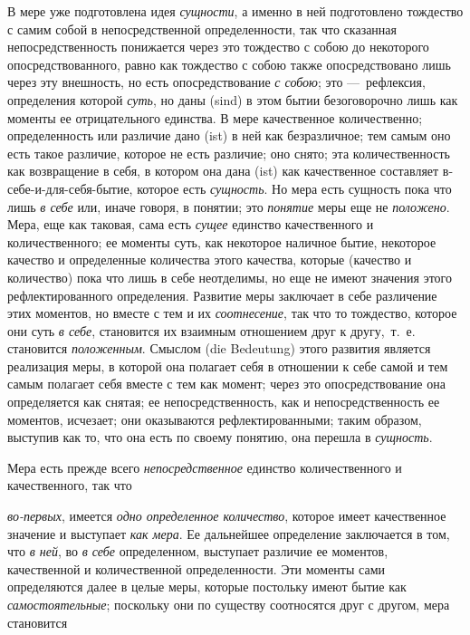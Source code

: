 В мере уже подготовлена идея {\em сущности}, а именно в
ней подготовлено тождество с самим собой в непосредственной определенности,
так что сказанная непосредственность понижается через это тождество с собою
до некоторого опосредствованного, равно как тождество с собою также
опосредствовано лишь через эту внешность, но есть опосредствование
{\em с собою}; это —~рефлексия, определения которой
{\em суть}, но даны (sind) в этом бытии безоговорочно
лишь как моменты ее отрицательного единства. В мере качественное
количественно; определенность или различие дано (ist) в ней как
безразличное; тем самым оно есть такое различие, которое не есть различие;
оно снято; эта количественность как возвращение в себя, в котором она дана
(ist) как качественное составляет в-себе-и-для-себя-бытие, которое есть
{\em сущность}. Но мера есть сущность пока что лишь
{\em в себе} или, иначе говоря, в понятии; это
{\em понятие} меры еще не
{\em положено}. Мера, еще как таковая, сама есть
{\em сущее} единство качественного и количественного;
ее моменты суть, как некоторое наличное бытие, некоторое качество и
определенные количества этого качества, которые (качество и количество)
пока что лишь в себе неотделимы, но еще не имеют значения этого
рефлектированного определения. Развитие меры заключает в себе различение
этих моментов, но вместе с тем и их {\em соотнесение},
так что то тождество, которое они суть {\em в себе},
становится их взаимным отношением друг к другу,~т.~е. становится
{\em положенным}. Смыслом (die Bedeutung) этого
развития является реализация меры, в которой она полагает себя в отношении
к себе самой и тем самым полагает себя вместе с тем как момент; через это
опосредствование она определяется как снятая; ее непосредственность, как и
непосредственность ее моментов, исчезает; они оказываются
рефлектированными; таким образом, выступив как то, что она есть по своему
понятию, она перешла в {\em сущность}.

Мера есть прежде всего {\em непосредственное} единство
количественного и качественного, так что

{\em во-первых}, имеется {\em одно
определенное количество}, которое имеет качественное значение и выступает
{\em как мера}. Ее дальнейшее определение заключается в
том, что {\em в ней}, во {\em в
себе} определенном, выступает различие ее моментов, качественной и
количественной определенности. Эти моменты сами определяются далее в целые
меры, которые постольку имеют бытие как
{\em самостоятельные}; поскольку они по существу
соотносятся друг с другом, мера становится

